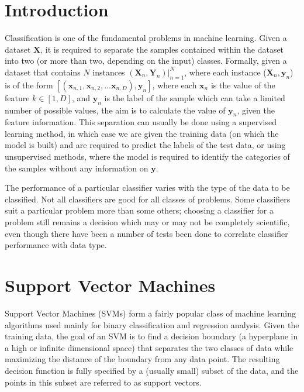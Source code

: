 \section{Introduction}
Classification is one of the fundamental problems in machine learning. Given a dataset $\mathbf{X}$, it is required to separate the samples contained within the dataset into two (or more than two, depending on the input) classes. Formally, given a dataset that contains $N$ instances $(\mathbf{X}_{n}, \mathbf{Y}_n) |_{n = 1}^{N}$, where each instance ($\mathbf{X}_{n}, \mathbf{y}_{n}$) is of the form $[(\mathbf{x}_{n, 1}, \mathbf{x}_{n, 2}, ... \mathbf{x}_{n, D}), \mathbf{y}_{n}]$, where each $\mathbf{x}_{n}$ is the value of the feature $k \in [1, D]$, and $\mathbf{y}_{n}$ is the label of the sample which can take a limited number of possible values, the aim is to calculate the value of $\mathbf{y}_{n}$, given the feature information. This separation can usually be done using a supervised learning method, in which case we are given the training data (on which the model is built) and are required to predict the labels of the test data, or using unsupervised methods, where the model is required to identify the categories of the samples without any information on $\mathbf{y}$.

The performance of a particular classifier varies with the type of the data to be classified. Not all classifiers are good for all classes of problems. Some classifiers suit a particular problem more than some others; choosing a classifier for a problem still remains a decision which may or may not be completely scientific, even though there have been a number of tests been done to correlate classifier performance with data type.

\section{Support Vector Machines}
Support Vector Machines (SVMs) form a fairly popular class of machine learning algorithms used mainly for binary classification and regression analysis. Given the training data, the goal of an SVM is to find a decision boundary (a hyperplane in a high or infinite dimensional space) that separates the two classes of data while maximizing the distance of the boundary from any data point. The resulting decision function is fully specified by a (usually small) subset of the data, and the points in this subset are referred to as support vectors.

